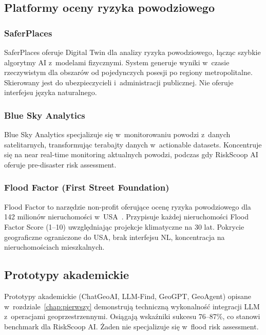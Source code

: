 \subsection{Platformy oceny ryzyka powodziowego}

\subsubsection{SaferPlaces}

SaferPlaces oferuje Digital Twin dla analizy ryzyka powodziowego, łącząc szybkie algorytmy AI z~modelami fizycznymi. System generuje wyniki w~czasie rzeczywistym dla obszarów od pojedynczych posesji po regiony metropolitalne. Skierowany jest do ubezpieczycieli i~administracji publicznej. Nie oferuje interfejsu języka naturalnego.

\subsubsection{Blue Sky Analytics}

Blue Sky Analytics specjalizuje się w~monitorowaniu powodzi z~danych satelitarnych, transformując terabajty danych w~actionable datasets. Koncentruje się na near real-time monitoring aktualnych powodzi, podczas gdy RiskScoop AI oferuje pre-disaster risk assessment.

\subsubsection{Flood Factor (First Street Foundation)}

Flood Factor to narzędzie non-profit oferujące ocenę ryzyka powodziowego dla 142 milionów nieruchomości w~USA~\cite{firststreet2020flood}. Przypisuje każdej nieruchomości Flood Factor Score (1--10) uwzględniając projekcje klimatyczne na 30 lat. Pokrycie geograficzne ograniczone do USA, brak interfejsu NL, koncentracja na nieruchomościach mieszkalnych.

\subsection{Prototypy akademickie}

Prototypy akademickie (ChatGeoAI, LLM-Find, GeoGPT, GeoAgent) opisane w~rozdziale~\ref{chap:pierwszy} demonstrują techniczną wykonalność integracji LLM z~operacjami geoprzestrzennymi. Osiągają wskaźniki sukcesu 76--87\%, co stanowi benchmark dla RiskScoop AI. Żaden nie specjalizuje się w~flood risk assessment.

